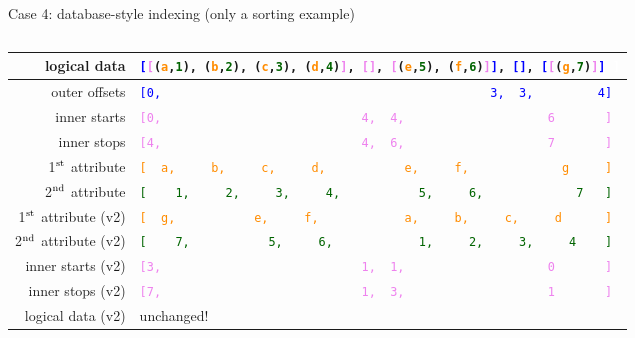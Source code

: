 \documentclass[aspectratio=169]{beamer}
\begin{document}
\begin{frame}{Case 4: database-style indexing (only a sorting example)}
\begin{columns}
\begin{tabular}{r l}
\small logical data & {\tt\scriptsize \textcolor{blue}{[}\textcolor{violet}{[}(\textcolor{darkorange}{a},\textcolor{darkgreen}{1}), (\textcolor{darkorange}{b},\textcolor{darkgreen}{2}), (\textcolor{darkorange}{c},\textcolor{darkgreen}{3}), (\textcolor{darkorange}{d},\textcolor{darkgreen}{4})\textcolor{violet}{]}, \textcolor{violet}{[]}, \textcolor{violet}{[}(\textcolor{darkorange}{e},\textcolor{darkgreen}{5}), (\textcolor{darkorange}{f},\textcolor{darkgreen}{6})\textcolor{violet}{]}\textcolor{blue}{]}, \textcolor{blue}{[]}, \textcolor{blue}{[}\textcolor{violet}{[}(\textcolor{darkorange}{g},\textcolor{darkgreen}{7})\textcolor{violet}{]}\textcolor{blue}{]}\ \textcolor{white}{]}} \\\hline
\small outer offsets & {\tt\scriptsize \textcolor{blue}{[0,\ \ \ \ \ \ \ \ \ \ \ \ \ \ \ \ \ \ \ \ \ \ \ \ \ \ \ \ \ \ \ \ \ \ \ \ \ \ \ \ \ \ \ \ \ \ 3,\ \ 3,\ \ \ \ \ \ \ \ \ 4]}} \\
\small inner starts & {\tt\scriptsize \textcolor{violet}{[0,\ \ \ \ \ \ \ \ \ \ \ \ \ \ \ \ \ \ \ \ \ \ \ \ \ \ \ \ 4,\ \ 4,\ \ \ \ \ \ \ \ \ \ \ \ \ \ \ \ \ \ \ \ 6\ \ \ \ \ \ \ ]}} \\
\small inner stops & {\tt\scriptsize \textcolor{violet}{[4,\ \ \ \ \ \ \ \ \ \ \ \ \ \ \ \ \ \ \ \ \ \ \ \ \ \ \ \ 4,\ \ 6,\ \ \ \ \ \ \ \ \ \ \ \ \ \ \ \ \ \ \ \ 7\ \ \ \ \ \ \ ]}} \\
\small 1$^{\mbox{\scriptsize st}}$ attribute & {\tt\scriptsize \textcolor{darkorange}{[\ \ a,\ \ \ \ \ b,\ \ \ \ \ c,\ \ \ \ \ d,\ \ \ \ \ \ \ \ \ \ \ e,\ \ \ \ \ f,\ \ \ \ \ \ \ \ \ \ \ \ \ g\ \ \ \ \ ]}} \\
\small 2$^{\mbox{\scriptsize nd}}$ attribute & {\tt\scriptsize \textcolor{darkgreen}{[\ \ \ \ 1,\ \ \ \ \ 2,\ \ \ \ \ 3,\ \ \ \ \ 4,\ \ \ \ \ \ \ \ \ \ \ 5,\ \ \ \ \ 6,\ \ \ \ \ \ \ \ \ \ \ \ \ 7\ \ \ ]}} \\\hline
\small 1$^{\mbox{\scriptsize st}}$ attribute (v2) & {\tt\scriptsize \textcolor{darkorange}{[\ \ g,\ \ \ \ \ \ \ \ \ \ \ e,\ \ \ \ \ f,\ \ \ \ \ \ \ \ \ \ \ \ a,\ \ \ \ \ b,\ \ \ \ \ c,\ \ \ \ \ d\ \ \ \ \ \ ]}} \\
\small 2$^{\mbox{\scriptsize nd}}$ attribute (v2) & {\tt\scriptsize \textcolor{darkgreen}{[\ \ \ \ 7,\ \ \ \ \ \ \ \ \ \ \ 5,\ \ \ \ \ 6,\ \ \ \ \ \ \ \ \ \ \ \ 1,\ \ \ \ \ 2,\ \ \ \ \ 3,\ \ \ \ \ 4\ \ \ \ ]}} \\
\small inner starts (v2) & {\tt\scriptsize \textcolor{violet}{[3,\ \ \ \ \ \ \ \ \ \ \ \ \ \ \ \ \ \ \ \ \ \ \ \ \ \ \ \ 1,\ \ 1,\ \ \ \ \ \ \ \ \ \ \ \ \ \ \ \ \ \ \ \ 0\ \ \ \ \ \ \ ]}} \\
\small inner stops (v2)  & {\tt\scriptsize \textcolor{violet}{[7,\ \ \ \ \ \ \ \ \ \ \ \ \ \ \ \ \ \ \ \ \ \ \ \ \ \ \ \ 1,\ \ 3,\ \ \ \ \ \ \ \ \ \ \ \ \ \ \ \ \ \ \ \ 1\ \ \ \ \ \ \ ]}} \\\hline
\small logical data (v2) & unchanged! \\
\end{tabular}
\end{columns}


\end{frame}
\end{document}
